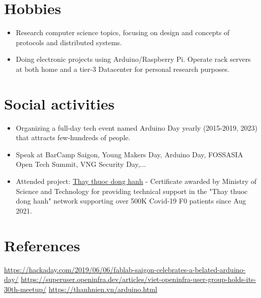 \documentclass[letterpaper,11pt]{article}
\newcommand{\resumeItemNornal}[1]{
  \item\small{
    {#1 \vspace{-2pt}}
  }
}
\newcommand{\resumeSubItemNormal}[1]{\resumeItemNornal{#1}\vspace{-4pt}}
\newcommand{\resumeSubHeadingListStart}{\begin{itemize}[leftmargin=*]}
\newcommand{\resumeSubHeadingListEnd}{\end{itemize}}
\begin{document}
\section{Hobbies}
  \resumeSubHeadingListStart
    \resumeSubItemNormal
      {Research computer science topics, focusing on design and concepts of protocols and distributed systems.}
  \resumeSubItemNormal
      {Doing electronic projects using Arduino/Raspberry Pi. Operate rack servers at both home and a tier-3 Datacenter for personal research purposes.}
\resumeSubHeadingListEnd

\section{Social activities}
  \resumeSubHeadingListStart
    \resumeSubItemNormal
      {Organizing a full-day tech event named Arduino Day yearly (2015-2019, 2023) that attracts few-hundreds of people.}
    \resumeSubItemNormal
      {Speak at BarCamp Saigon, Young Makers Day, Arduino Day, FOSSASIA Open Tech Summit, VNG Security Day,...}
    \resumeSubItemNormal
      {Attended project: \href{https://thaythuocdonghanh.vn}{Thay thuoc dong hanh} - Certificate awarded by Ministry of Science and Technology for providing technical support in the "Thay thuoc dong hanh" network supporting over 500K Covid-19 F0 patients since Aug 2021.}
\resumeSubHeadingListEnd

\section{References}
    \small{\href{https://hackaday.com/2019/06/06/fablab-saigon-celebrates-a-belated-arduino-day/}{https://hackaday.com/2019/06/06/fablab-saigon-celebrates-a-belated-arduino-day/}}
    \small{\href{https://superuser.openinfra.dev/articles/viet-openinfra-user-group-holds-its-30th-meetup/}{https://superuser.openinfra.dev/articles/viet-openinfra-user-group-holds-its-30th-meetup/}}\newline
    \small{\href{https://thanhnien.vn/vi-sao-nhieu-nguoi-me-arduino-nen-tang-duoc-cho-la-tien-than-cua-giao-duc-stem-185230704165819482.htm}{https://thanhnien.vn/arduino.html}}
   
\end{document}
